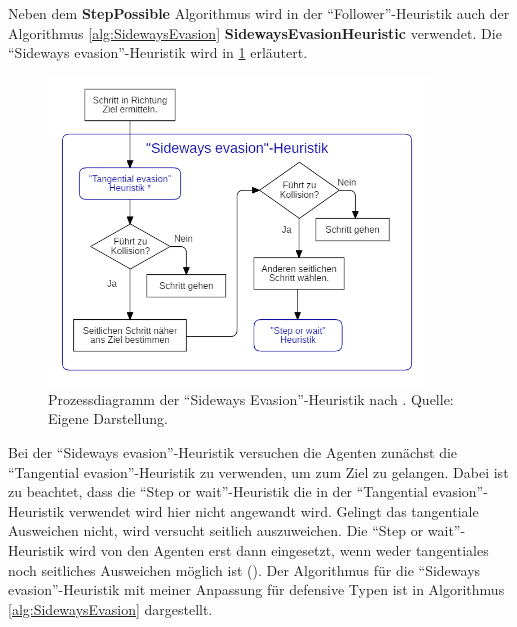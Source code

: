 Neben dem \textbf{StepPossible} Algorithmus wird in der "`Follower"'-Heuristik auch der Algorithmus \ref{alg:SidewaysEvasion} \textbf{SidewaysEvasionHeuristic} verwendet. Die "`Sideways evasion"'-Heuristik wird in \figurename \ref{fig:sidewayHeuristik} erläutert.
\begin{figure}[H]
	\centering
		\includegraphics[width=0.9\textwidth]{pictures/model/algorithm/heuristics/sideways_evasion_heuristic.png}
	\caption{Prozessdiagramm der "`Sideways Evasion"'-Heuristik nach \cite{Seitz.2016}. Quelle: Eigene Darstellung.}
	\label{fig:sidewayHeuristik}
\end{figure} 
Bei der "`Sideways evasion"'-Heuristik versuchen die Agenten zunächst die "`Tangential evasion"'-Heuristik zu verwenden, um zum Ziel zu gelangen. Dabei ist zu beachtet, dass die "`Step or wait"'-Heuristik die in  der "`Tangential evasion"'-Heuristik verwendet wird hier nicht angewandt wird. Gelingt das tangentiale Ausweichen nicht, wird versucht seitlich auszuweichen. Die "`Step or wait"'-Heuristik wird von den Agenten erst dann eingesetzt, wenn weder tangentiales noch seitliches Ausweichen möglich ist (\cite{Seitz.2016}). Der Algorithmus für die "`Sideways evasion"'-Heuristik mit meiner Anpassung für defensive Typen ist in Algorithmus \ref{alg:SidewaysEvasion} dargestellt.
\clearpage
